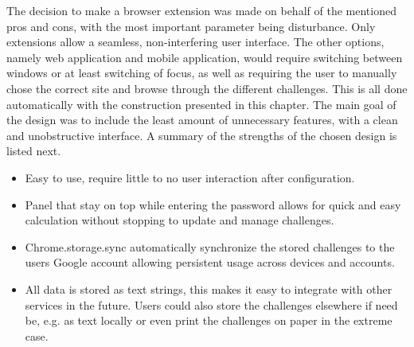 \par The decision to make a browser extension was made on behalf of the mentioned pros and cons, with the most important parameter being disturbance. Only extensions allow a seamless, non-interfering user interface. The other options, namely web application and mobile application, would require switching between windows or at least switching of focus, as well as requiring the user to manually chose the correct site and browse through the different challenges. This is all done automatically with the construction presented in this chapter. The main goal of the design was to include the least amount of unnecessary features, with a clean and unobstructive interface. A summary of the strengths of the chosen design is listed next.

\begin{itemize}
    \item Easy to use, require little to no user interaction after configuration.
    \item Panel that stay on top while entering the password allows for quick and easy calculation without stopping to update and manage challenges.
    \item Chrome.storage.sync automatically synchronize the stored challenges to the users Google account allowing persistent usage across devices and accounts.
    \item All data is stored as text strings, this makes it easy to integrate with other services in the future. Users could also store the challenges elsewhere if need be, e.g. as text locally or even print the challenges on paper in the extreme case.
\end{itemize}






